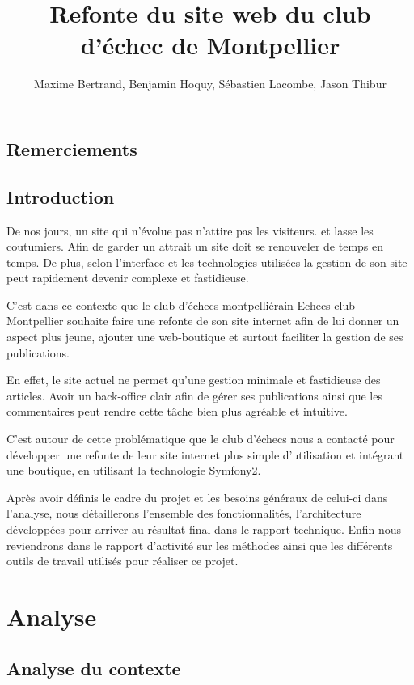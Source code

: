 \documentclass[a4paper,11pt]{report}
\title{Refonte du site web du club d'échec de Montpellier}
\author{Maxime Bertrand, Benjamin Hoquy, Sébastien Lacombe, Jason Thibur}
\begin{document}
\newpage

\renewcommand{\contentsname}{Sommaire}
\renewcommand{\chaptername}{}

\maketitle
\tableofcontents

\chapter*{Remerciements}

\chapter*{Introduction}
De nos jours, un site qui n’évolue pas n’attire pas les visiteurs. et lasse les coutumiers. Afin de garder un attrait un site doit se renouveler de temps en temps. De plus, selon l’interface et les technologies utilisées la gestion de son site peut rapidement devenir complexe et fastidieuse.

C’est dans ce contexte que le club d’échecs montpelliérain Echecs club Montpellier souhaite faire une refonte de son site internet afin de lui donner un aspect plus jeune, ajouter une web-boutique et surtout faciliter la gestion de ses publications.

En effet, le site actuel ne permet qu’une gestion minimale et fastidieuse des articles. Avoir un back-office clair afin de gérer ses publications ainsi que les commentaires peut rendre cette tâche bien plus agréable et intuitive.

C’est autour de cette problématique que le club d’échecs nous a contacté pour développer une refonte de leur site internet plus simple d’utilisation et intégrant une boutique, en utilisant la technologie Symfony2.

Après avoir définis le cadre du projet et les besoins généraux de celui-ci dans l’analyse, nous détaillerons l’ensemble des fonctionnalités, l’architecture développées pour arriver au résultat final dans le rapport technique. Enfin nous reviendrons dans le rapport d’activité sur les méthodes ainsi que les différents outils de travail utilisés pour réaliser ce projet.

\part{Analyse}
\chapter{Analyse du contexte}
\end{document}
